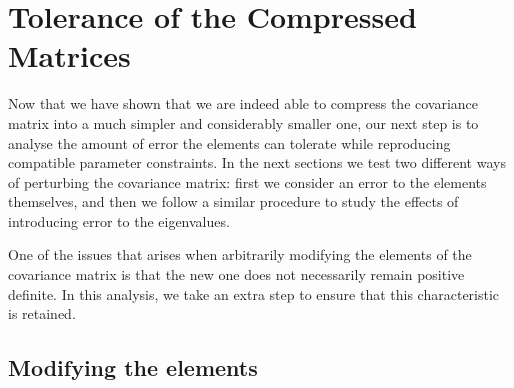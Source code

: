 \documentclass[twocolumn]{\docclass}
\def\bea{\begin{eqnarray}}
\def\eea{\end{eqnarray}}
\begin{document}
	\section{Tolerance of the Compressed Matrices}
	\label{sec:tolerance}
	
	Now that we have shown that we are indeed able to compress the covariance matrix into a much simpler and considerably smaller one, our next step is to analyse the amount of error the elements can tolerate while reproducing compatible parameter constraints. In the next sections we test two different ways of perturbing the covariance matrix: first we consider an error to the elements themselves, and then we follow a similar procedure to study the effects of introducing error to the eigenvalues.
	
	
	One of the issues that arises when arbitrarily modifying the elements of the covariance matrix is that the new one does not necessarily remain positive definite. In this analysis, we take an extra step to ensure that this characteristic is retained.
	
	\subsection{Modifying the elements}
	
\end{document}
